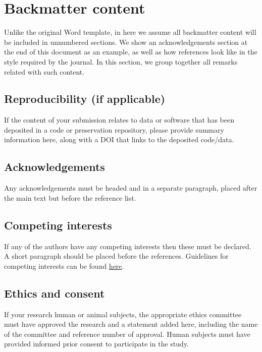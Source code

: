 \section{Backmatter content}\label{sec:backmatter}

Unlike the original Word template, in here we assume all backmatter
content will be included in unnumbered sections.
We show an acknowledgements section at the end of this document
as an example, as well as how references look like in the style
required by the journal.
In this section, we group together all remarks related with such
content.

\subsection{Reproducibility (if applicable)}

If the content of your submission relates to data or software 
that has been deposited in a code or preservation repository,
please provide summary information here, along with a DOI that
links to the deposited code/data.

\subsection{Acknowledgements}

Any acknowledgements must be headed and in a separate paragraph, 
placed after the main text but before the reference list.

\subsection{Competing interests}

If any of the authors have any competing interests then these
must be declared. A short paragraph should be placed before
the references. 
Guidelines for competing interests can be found \href{http://transactions.ismir.net/information/competingInterestGuidelines}{here}.%

\subsection{Ethics and consent}

If your research human or animal subjects, the appropriate ethics
committee must have approved the research and a statement added here,
including the name of the committee and reference number of approval.
Human subjects must have provided informed prior consent 
to participate in the study.

